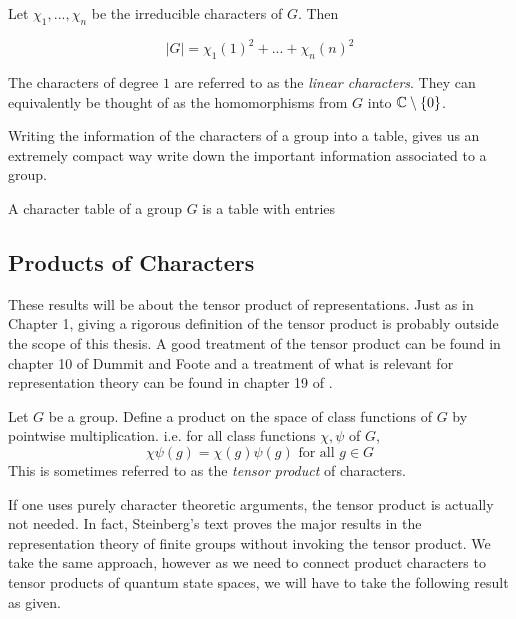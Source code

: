 \begin{theorem}
    Let $\chi_1, ... ,\chi_n$ be the irreducible characters of $G$. Then

    \[
        |G| = \chi_1(1)^2 + ... + \chi_n(n)^2
    \]
\end{theorem}

\begin{definition}
    The characters of degree $1$ are referred to as the \emph{linear characters}. They can equivalently be thought 
    of as the homomorphisms from $G$ into $\mathbb{C}\setminus \{0\}$.
\end{definition}

    
    Writing the information of the characters of a group into a table, gives us an extremely compact way write down 
    the important information associated to a group.

\begin{definition}
    A character table of a group $G$ is a table with entries 
\end{definition}

\subsection{Products of Characters}

These results will be about the tensor product of representations. Just as in Chapter 1, giving a rigorous 
definition of the tensor product is probably outside the scope of this thesis. A good treatment of the tensor 
product can be found in chapter 10 of Dummit and Foote \cite{foote} and a treatment of what is relevant for 
representation theory can be found in chapter 19 of \cite{James&Liebeck}.

\begin{definition}
    Let $G$ be a group. Define a product on the space of class functions of $G$ by pointwise multiplication. i.e.
    for all class functions $\chi, \psi$ of $G$, 
    \[
        \chi\psi(g) = \chi(g)\psi(g) \text{ for all } g \in G
    \]
    This is sometimes referred to as the \emph{tensor product} of characters.
\end{definition}

If one uses purely character theoretic arguments, the tensor product is actually not needed. In fact, Steinberg's 
text \cite{steinberg} proves the major results in the representation theory of finite groups without invoking the 
tensor product. We take the same approach, however as we need to connect product characters to tensor products of 
quantum state spaces, we will have to take the following result as given.


